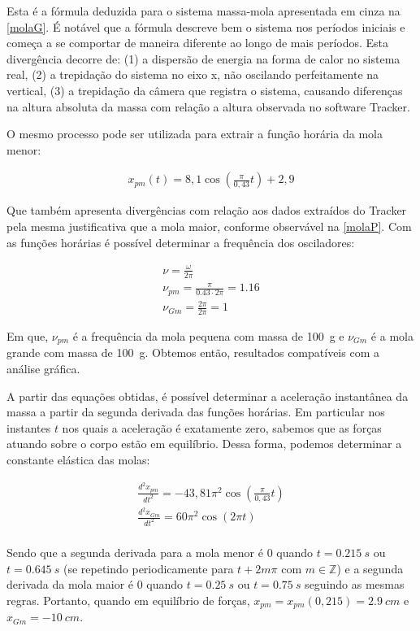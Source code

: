 Esta é a fórmula deduzida para o sistema massa-mola apresentada em cinza na \cref{molaG}. É notável que a fórmula descreve bem o sistema nos períodos iniciais e começa a se comportar de maneira diferente ao longo de mais períodos. Esta divergência decorre de: (1) a dispersão de energia na forma de calor no sistema real, (2) a trepidação do sistema no eixo x, não oscilando perfeitamente na vertical, (3) a trepidação da câmera que registra o sistema, causando diferenças na altura absoluta da massa com relação a altura observada no software Tracker.

O mesmo processo pode ser utilizada para extrair a função horária da mola menor:

\begin{align*}
x_{pm}(t) = 8,1 \cos(\frac{\pi}{0,43}t) + 2,9
\end{align*}

    Que também apresenta divergências com relação aos dados extraídos do Tracker pela mesma justificativa que a mola maior, conforme observável na \cref{molaP}.
    Com as funções horárias é possível determinar a frequência dos osciladores:

\begin{align*}
    \nu = \frac{\omega}{2\pi}\\
    \nu_{pm} = \frac{\pi}{\num{0,43} \cdot 2\pi} = \num{1,16}\\ 
    \nu_{Gm} = \frac{2\pi}{2\pi} = 1
\end{align*}

Em que, \(\nu_{pm}\) é a frequência da mola pequena com massa de \qty{100}{g} e \(\nu_{Gm}\) é a mola grande com massa de \qty{100}{g}. Obtemos então, resultados compatíveis com a análise gráfica.

A partir das equações obtidas, é possível determinar a aceleração instantânea da massa a partir da segunda derivada das funções horárias. Em particular nos instantes \(t\) nos quais a aceleração é exatamente zero, sabemos que as forças atuando sobre o corpo estão em equilíbrio. Dessa forma, podemos determinar a constante elástica das molas:

\begin{align}
    \frac{d^2x_{pm}}{dt^2} = -43,81 \pi^2 \cos(\frac{\pi}{0,43}t)\\
    \frac{d^2x_{Gm}}{dt^2} = 60 \pi^2 \cos(2\pi t)\\ 
\end{align}

Sendo que a segunda derivada para a mola menor é 0 quando \(t = \qty{0,215}{s}\) ou \(t = \qty{0,645}{s}\) (se repetindo periodicamente para \(t + 2m\pi\) com \(m \in \mathbb{Z}\)) e a segunda derivada da mola maior é 0 quando \(t = \qty{0,25}{s}\) ou \(t = \qty{0,75}{s}\) seguindo as mesmas regras. Portanto, quando em equilíbrio de forças, \(x_{pm} = x_{pm}(0,215) = \qty{2,9}{cm}\) e \(x_{Gm} = \qty{-10}{cm}\).  

